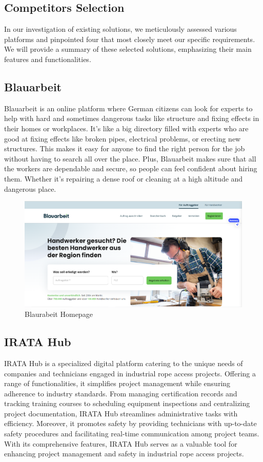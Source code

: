 \subsection{Competitors Selection}
In our investigation of existing solutions, we meticulously assessed various platforms and pinpointed four that most closely meet our specific requirements. We will provide a summary of these selected solutions, emphasizing their main features and functionalities.

\subsection{Blauarbeit}
Blauarbeit is an online platform where German citizens can look for experts to help with hard and sometimes dangerous tasks like structure and fixing effects in their homes or workplaces. It's like a big directory filled with experts who are good at fixing effects like broken pipes, electrical problems, or erecting new structures. This makes it easy for anyone to find the right person for the job without having to search all over the place. Plus, Blauarbeit makes sure that all the workers are dependable and secure, so people can feel confident about hiring them. Whether it's repairing a dense roof or cleaning at a high altitude and dangerous place.

\begin{figure}[H]
    \centering
    \includegraphics[width=\linewidth]{src/assets/chapters/Blaurabeit.PNG}
    \caption{Blaurabeit Homepage}
    \label{fig:blaurabeit_image}
\end{figure}

\subsection{IRATA Hub}
IRATA Hub is a specialized digital platform catering to the unique needs of companies and technicians engaged in industrial rope access projects. Offering a range of functionalities, it simplifies project management while ensuring adherence to industry standards. From managing certification records and tracking training courses to scheduling equipment inspections and centralizing project documentation, IRATA Hub streamlines administrative tasks with efficiency. Moreover, it promotes safety by providing technicians with up-to-date safety procedures and facilitating real-time communication among project teams. With its comprehensive features, IRATA Hub serves as a valuable tool for enhancing project management and safety in industrial rope access projects.

